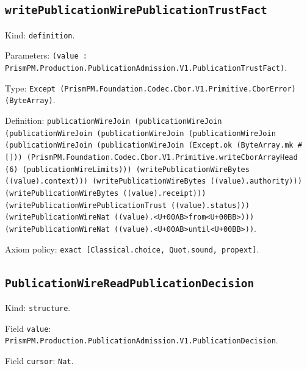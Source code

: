 \documentclass[11pt]{article}
\begin{document}
\subsection*{\texttt{writePublicationWirePublicationTrustFact}}
\noindent Kind: \texttt{definition}.\par
\noindent Parameters: \texttt{(value : PrismPM.Production.PublicationAdmission.V1.PublicationTrustFact)}.\par
\noindent Type: \texttt{Except (PrismPM.Foundation.Codec.Cbor.V1.Primitive.CborError) (ByteArray)}.\par
\noindent Definition: \texttt{publicationWireJoin (publicationWireJoin (publicationWireJoin (publicationWireJoin (publicationWireJoin (publicationWireJoin (publicationWireJoin (Except.ok (ByteArray.mk \#[])) (PrismPM.Foundation.Codec.Cbor.V1.Primitive.writeCborArrayHead (6) (publicationWireLimits))) (writePublicationWireBytes ((value).context))) (writePublicationWireBytes ((value).authority))) (writePublicationWireBytes ((value).receipt))) (writePublicationWirePublicationTrust ((value).status))) (writePublicationWireNat ((value).<U+00AB>from<U+00BB>))) (writePublicationWireNat ((value).<U+00AB>until<U+00BB>))}.\par
\noindent Axiom policy: \texttt{exact [Classical.choice, Quot.sound, propext]}.\par
\subsection*{\texttt{PublicationWireReadPublicationDecision}}
\noindent Kind: \texttt{structure}.\par
\noindent Field \texttt{value}: \texttt{PrismPM.Production.PublicationAdmission.V1.PublicationDecision}.\par
\noindent Field \texttt{cursor}: \texttt{Nat}.\par
\end{document}

